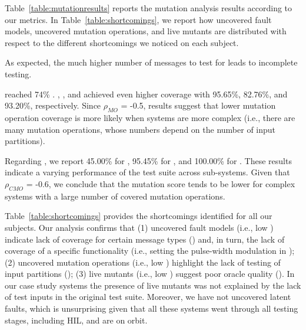 



Table~\ref{table:mutationresults} reports the mutation analysis results according to our metrics.
In Table~\ref{table:shortcomings}, we report how uncovered fault models, uncovered mutation operations, and live mutants are distributed with respect to the different shortcomings we noticed on each subject.

As expected, the much higher number of messages to test for \ADCS leads to incomplete testing.

\ADCS reached 74\% .  \GPS, \PDHU, and \PARAM  achieved even higher coverage with 95.65\%, 82.76\%, and 93.20\%,  respectively. Since
$\rho_{MO}$ = -0.5, results suggest that lower mutation operation coverage is more likely when systems are more complex (i.e., there are many mutation operations, whose numbers depend on the number of input partitions).

Regarding , we report 45.00\% for \ADCS,  95.45\% for \GPS,  and 100.00\% for \PDHU. These results indicate a varying performance of the \SVF test suite across sub-systems.
Given that
$\rho_{CMO}$ = -0.6,
we conclude that the mutation score tends to be lower for complex systems with a large number of covered mutation operations.

Table~\ref{table:shortcomings} provides the shortcomings identified for all our subjects.
Our analysis confirms that (1) uncovered fault models (i.e., low ) indicate lack of coverage for certain message types () and, in turn, the lack of coverage of a specific functionality (i.e., setting the pulse-width modulation in \ADCS); (2) uncovered mutation operations (i.e., low ) highlight the lack of testing of input partitions (); (3) live mutants (i.e., low ) suggest poor oracle quality (). In our case study systems the presence of live mutants was not explained by the lack of test inputs in the original test suite. Moreover, we have not uncovered latent faults, which is unsurprising given that all these systems went through all testing stages, including HIL, and are on orbit.


